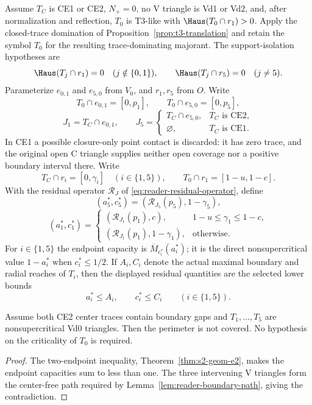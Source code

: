 \begin{definition}
\label{def:body-t3-endpoint-state}
Assume $T_C$ is CE1 or CE2, $N_+=0$, no V triangle is Vd1 or Vd2, and,
after normalization and reflection, $T_0$ is T3-like with
$\Haus(T_0\cap r_1)>0$. Apply the closed-trace domination of
Proposition~\ref{prop:t3-translation} and retain the symbol $T_0$ for the
resulting trace-dominating majorant. The support-isolation hypotheses are
\[
 \Haus(T_j\cap r_1)=0\quad(j\notin\{0,1\}),
 \qquad
 \Haus(T_j\cap r_5)=0\quad(j\ne5).
\]
Parameterize $e_{0,1}$ and $e_{5,0}$ from $V_0$, and $r_1,r_5$ from $O$.
Write
\[
 T_0\cap e_{0,1}=[0,p_1],\qquad
 T_0\cap e_{5,0}=[0,p_5],
\]
\[
 J_1=T_C\cap e_{0,1},\qquad
 J_5=
 \begin{cases}
 T_C\cap e_{5,0},&T_C\text{ is CE2},\\
 \varnothing,&T_C\text{ is CE1}.
 \end{cases}
\]
In CE1 a possible closure-only point contact is discarded: it has zero trace,
and the original open C triangle supplies neither open coverage nor a
positive boundary interval there. Write
\[
 T_C\cap r_i=[0,\gamma_i]\quad(i\in\{1,5\}),\qquad
 T_0\cap r_1=[1-u,1-c].
\]
With the residual operator $\mathcal R_J$ of
\eqref{eq:reader-residual-operator}, define
\[
 (a_5^\ast,c_5^\ast)
 =\left(\mathcal R_{J_5}(p_5),1-\gamma_5\right),
\]
\[
 (a_1^\ast,c_1^\ast)=
 \begin{cases}
 \left(\mathcal R_{J_1}(p_1),c\right),
   &1-u\le\gamma_1\le1-c,\\
 \left(\mathcal R_{J_1}(p_1),1-\gamma_1\right),
   &\text{otherwise}.
 \end{cases}
\]
For $i\in\{1,5\}$ the endpoint capacity is
$\overline M_{c_i^\ast}(a_i^\ast)$; it is the direct nonsupercritical value
$1-a_i^\ast$ when $c_i^\ast\le1/2$.
If $A_i,C_i$ denote the actual maximal boundary and radial reaches of $T_i$,
then the displayed residual quantities are the selected lower bounds
\[
 a_i^\ast\le A_i,\qquad c_i^\ast\le C_i
 \qquad(i\in\{1,5\}).
\]
\end{definition}

\begin{proposition}
\label{prop:reader-common-two-gap}
Assume both CE2 center traces contain boundary gaps and
$T_1,\ldots,T_5$ are nonsupercritical Vd0 triangles. Then the perimeter is
not covered. No hypothesis on the criticality of $T_0$ is required.
\end{proposition}

\begin{proof}
The two-endpoint inequality, Theorem~\ref{thm:s2-geom-e2}, makes the endpoint
capacities sum to less than one. The three intervening V triangles form the
center-free path required by Lemma~\ref{lem:reader-boundary-path}, giving the
contradiction.
\end{proof}
